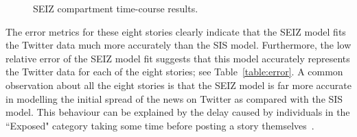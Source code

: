 \begin{figure}[h]
{   \label{fig:Obama_time}
 }
\vspace{-0.5em}
\caption{SEIZ compartment time-course results.
\label{fig:Time_course}
}
\end{figure}


The error metrics for these eight stories clearly indicate that the SEIZ model fits the Twitter data much more accurately than the SIS model. Furthermore, the low relative error of the SEIZ model fit suggests that this model accurately represents the Twitter data for each of the eight stories; see Table~\ref{table:error}. A common observation about all the eight stories is that the SEIZ model is far more accurate in modelling the initial spread of the news on Twitter as compared with the SIS model. This behaviour can be explained by the delay caused by individuals in the ``Exposed" category taking some time before posting a story themselves~\cite{powerofgoodidea:2006}.

